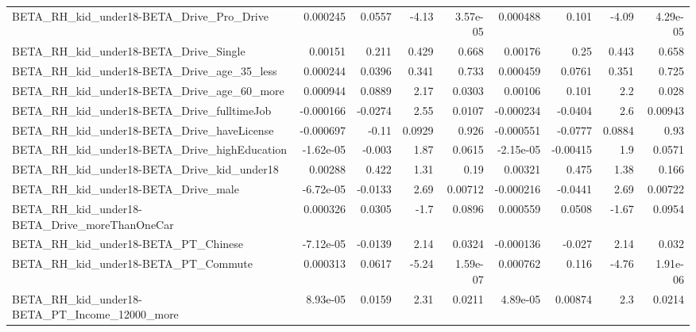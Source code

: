 \begin{tabular}{lrrrrrrrr}
BETA\_RH\_kid\_under18-BETA\_Drive\_Pro\_Drive           &    0.000245 &       0.0557 &     -4.13 & 3.57e-05 &   0.000488 &       0.101 &        -4.09 &      4.29e-05 \\
BETA\_RH\_kid\_under18-BETA\_Drive\_Single              &     0.00151 &        0.211 &     0.429 &    0.668 &    0.00176 &        0.25 &        0.443 &         0.658 \\
BETA\_RH\_kid\_under18-BETA\_Drive\_age\_35\_less         &    0.000244 &       0.0396 &     0.341 &    0.733 &   0.000459 &      0.0761 &        0.351 &         0.725 \\
BETA\_RH\_kid\_under18-BETA\_Drive\_age\_60\_more         &    0.000944 &       0.0889 &      2.17 &   0.0303 &    0.00106 &       0.101 &          2.2 &         0.028 \\
BETA\_RH\_kid\_under18-BETA\_Drive\_fulltimeJob         &   -0.000166 &      -0.0274 &      2.55 &   0.0107 &  -0.000234 &     -0.0404 &          2.6 &       0.00943 \\
BETA\_RH\_kid\_under18-BETA\_Drive\_haveLicense         &   -0.000697 &        -0.11 &    0.0929 &    0.926 &  -0.000551 &     -0.0777 &       0.0884 &          0.93 \\
BETA\_RH\_kid\_under18-BETA\_Drive\_highEducation       &   -1.62e-05 &       -0.003 &      1.87 &   0.0615 &  -2.15e-05 &    -0.00415 &          1.9 &        0.0571 \\
BETA\_RH\_kid\_under18-BETA\_Drive\_kid\_under18         &     0.00288 &        0.422 &      1.31 &     0.19 &    0.00321 &       0.475 &         1.38 &         0.166 \\
BETA\_RH\_kid\_under18-BETA\_Drive\_male                &   -6.72e-05 &      -0.0133 &      2.69 &  0.00712 &  -0.000216 &     -0.0441 &         2.69 &       0.00722 \\
BETA\_RH\_kid\_under18-BETA\_Drive\_moreThanOneCar      &    0.000326 &       0.0305 &      -1.7 &   0.0896 &   0.000559 &      0.0508 &        -1.67 &        0.0954 \\
BETA\_RH\_kid\_under18-BETA\_PT\_Chinese                &   -7.12e-05 &      -0.0139 &      2.14 &   0.0324 &  -0.000136 &      -0.027 &         2.14 &         0.032 \\
BETA\_RH\_kid\_under18-BETA\_PT\_Commute                &    0.000313 &       0.0617 &     -5.24 & 1.59e-07 &   0.000762 &       0.116 &        -4.76 &      1.91e-06 \\
BETA\_RH\_kid\_under18-BETA\_PT\_Income\_12000\_more      &    8.93e-05 &       0.0159 &      2.31 &   0.0211 &   4.89e-05 &     0.00874 &          2.3 &        0.0214 \\

\end{tabular}
